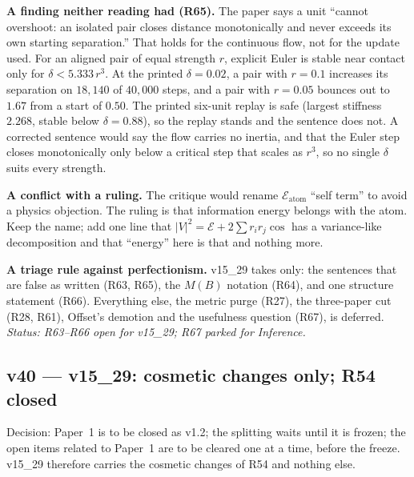 \documentclass[11pt]{article}
\begin{document}
\textbf{A finding neither reading had (R65).} The paper says a unit ``cannot overshoot: an isolated pair closes distance monotonically
and never exceeds its own starting separation.'' That holds for the continuous flow, not for the update used. For an aligned pair of equal strength
$r$, explicit Euler is stable near contact only for $\delta<5.333\,r^3$. At the printed $\delta=0.02$, a pair with $r=0.1$ increases its separation on $18{,}140$ of $40{,}000$ steps, and a pair with
$r=0.05$ bounces out to $1.67$ from a start of $0.50$. The printed six-unit replay is safe (largest stiffness $2.268$, stable below $\delta=0.88$), so the replay stands and the sentence does not. A
corrected sentence would say the flow carries no inertia, and that the Euler step closes monotonically only below a critical step that scales as $r^3$, so no
single $\delta$ suits every strength.

\textbf{A conflict with a ruling.} The critique would rename $\mathcal E_{\text{atom}}$ ``self term'' to avoid a physics objection. The ruling is that
information energy belongs with the atom. Keep the name; add one line that $\lvert V\rvert^2=\mathcal E+2\sum r_ir_j\cos$ has a variance-like decomposition and that ``energy'' here is that
and nothing more.

\textbf{A triage rule against perfectionism.} v15\_29 takes only: the sentences that are false as written (R63, R65), the $M(B)$ notation (R64), and one structure
statement (R66). Everything else, the metric purge (R27), the three-paper cut (R28, R61), Offset's demotion and the usefulness question (R67), is deferred.
\emph{Status: R63--R66 open for v15\_29; R67 parked for Inference.}


\subsection*{v40 --- v15\_29: cosmetic changes only; R54 closed}
Decision: Paper~1 is to be closed as v1.2; the splitting waits until it is frozen; the open items related to Paper~1 are to be cleared one at a time,
before the freeze. v15\_29 therefore carries the cosmetic changes of R54 and nothing else.
\end{document}
